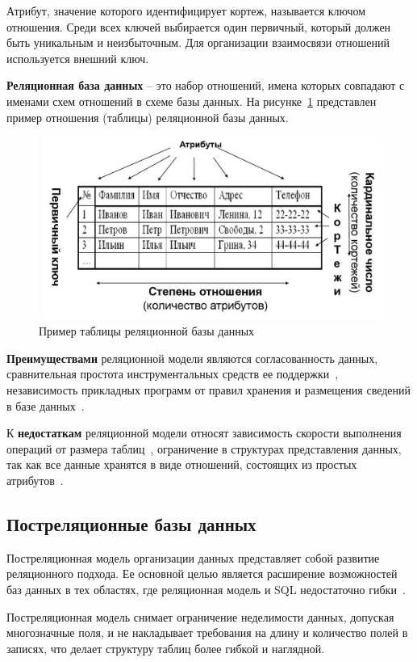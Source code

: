 Атрибут, значение которого идентифицирует кортеж, называется ключом отношения. Среди всех ключей выбирается один первичный, который должен быть уникальным и неизбыточным. Для организации взаимосвязи отношений используется внешний ключ.


\textbf{Реляционная база данных} -- это набор отношений, имена которых совпадают с именами схем отношений в схеме базы данных. На рисунке~\ref{relyac_example} представлен пример отношения (таблицы) реляционной базы данных.

\begin{figure}[H]
	\centering
	\includegraphics[width=0.8\linewidth]{img/relyac_db.jpg}
	\caption{Пример таблицы реляционной базы данных}
	\label{relyac_example}
\end{figure}

\textbf{Преимуществами} реляционной модели являются согласованность данных, сравнительная простота инструментальных средств ее поддержки~\cite{ilushechkinz}, независимость прикладных программ от правил хранения и размещения сведений в базе данных~\cite{struzhkin}.

К \textbf{недостаткам} реляционной модели относят зависимость скорости выполнения операций от размера таблиц~\cite{ilushechkinz}, ограничение в структурах представления данных, так как все данные хранятся в виде отношений, состоящих из простых атрибутов~\cite{markin}.

\subsection{Постреляционные базы данных}
Постреляционная модель организации данных представляет собой развитие реляционного подхода. Ее основной целью является расширение возможностей баз данных в тех областях, где реляционная модель и SQL недостаточно гибки~\cite{markin}.

Постреляционная модель снимает ограничение неделимости данных, допуская многозначные поля, и не накладывает требования на длину и количество полей в записях, что делает структуру таблиц более гибкой и наглядной.

